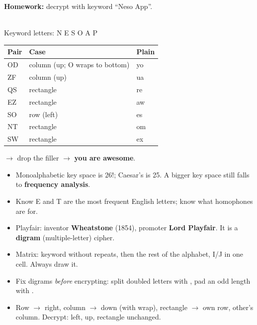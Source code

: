 \textbf{Homework:} decrypt  with keyword ``Neso App''.

\begin{minipage}[c]{0.36\textwidth}
\centering
{}\\[2pt]
{\footnotesize Keyword letters: N E S O A P}
\end{minipage}\hfill
\begin{minipage}[c]{0.6\textwidth}
\small
\begin{tabular}{@{}lll@{}}
\toprule
Pair & Case & Plain\\
\midrule
OD & column (up; O wraps to bottom) & yo\\
ZF & column (up) & ua\\
QS & rectangle & re\\
EZ & rectangle & aw\\
SO & row (left) & es\\
NT & rectangle & om\\
SW & rectangle & ex\\
\bottomrule
\end{tabular}
\end{minipage}

\medskip
{} $\to$ drop the filler $\to$ \textbf{you are awesome}.

\begin{examtip}
\begin{itemize}
  \item Monoalphabetic key space is $26!$; Caesar's is 25. A bigger key space still falls to \textbf{frequency analysis}.
  \item Know E and T are the most frequent English letters; know what homophones are for.
  \item Playfair: inventor \textbf{Wheatstone} (1854), promoter \textbf{Lord Playfair}. It is a \textbf{digram} (multiple-letter) cipher.
  \item Matrix: keyword without repeats, then the rest of the alphabet, I/J in one cell. Always draw it.
  \item Fix digrams \emph{before} encrypting: split doubled letters with , pad an odd length with .
  \item Row $\to$ right, column $\to$ down (with wrap), rectangle $\to$ own row, other's column. Decrypt: left, up, rectangle unchanged.
\end{itemize}
\end{examtip}

